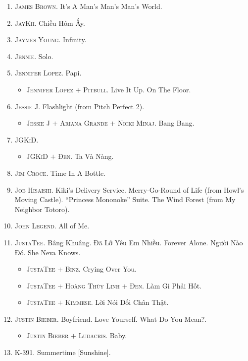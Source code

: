 \documentclass[oneside]{book}
\numberwithin{equation}{section}
\begin{document}
\begin{enumerate}
	\item \textsc{James Brown.} It's A Man's Man's Man's World.
	\item \textsc{JayKii.} Chiều Hôm Ấy.
	\item \textsc{Jaymes Young.} Infinity.
	\item \textsc{Jennie.} Solo.
	\item \textsc{Jennifer Lopez.} Papi.
	\begin{itemize}
		\item \textsc{Jennifer Lopez $+$ Pitbull.} Live It Up. On The Floor.
	\end{itemize}
	\item \textsc{Jessie J.} Flashlight (from Pitch Perfect 2).
	\begin{itemize}
		\item \textsc{Jessie J $+$ Ariana Grande $+$ Nicki Minaj.} Bang Bang.
	\end{itemize}
	\item \textsc{JGKiD.}
	\begin{itemize}
		\item \textsc{JGKiD $+$ Đen.} Ta Và Nàng.
	\end{itemize}
	\item \textsc{Jim Croce.} Time In A Bottle.
	\item \textsc{Joe Hisaishi.} Kiki's Delivery Service. Merry-Go-Round of Life (from Howl's Moving Castle). ``Princess Mononoke'' Suite. The Wind Forest (from My Neighbor Totoro).
	\item \textsc{John Legend.} All of Me.
	\item \textsc{JustaTee.} Bâng Khuâng. Đã Lỡ Yêu Em Nhiều. Forever Alone. Người Nào Đó. She Neva Knows.
	\begin{itemize}
		\item \textsc{JustaTee $+$ Binz.} Crying Over You.
		\item \textsc{JustaTee $+$ Hoàng Thùy Linh $+$ Đen.} Làm Gì Phải Hốt.
		\item \textsc{JustaTee $+$ Kimmese.} Lời Nói Dối Chân Thật.
	\end{itemize}
	\item \textsc{Justin Bieber.} Boyfriend. Love Yourself. What Do You Mean?.
	\begin{itemize}
		\item \textsc{Justin Bieber $+$ Ludacris.} Baby.
	\end{itemize}
	\item \textsc{K-391.} Summertime [Sunshine].
	\begin{itemize}

\end{itemize}
\end{enumerate}
\end{document}
